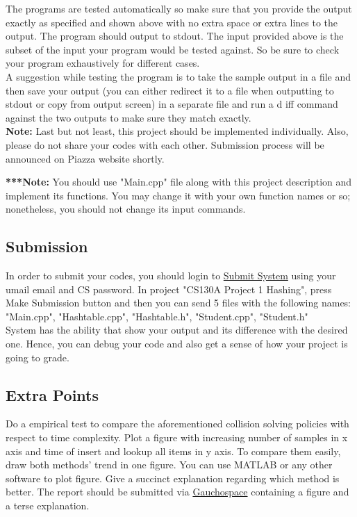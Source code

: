 \documentclass[times, 12pt]{article}
\begin{document}
The programs are tested automatically so make sure that you provide the output exactly as specified and shown above with no extra space or extra lines to the output. The program should output to stdout. The input provided above is the subset of the input your program would be
tested against. So be sure to check your program exhaustively for different cases.\\

A suggestion while testing the program is to take the sample output in a file and then save your output (you can either redirect it to a file when outputting to stdout or copy
from output screen) in a separate file and run a d	iff command against the two outputs to make sure they match exactly.\\

\textbf{Note:} Last but not least, this project should be implemented individually. Also, please do not share your codes with each other. Submission process will be announced on Piazza website shortly.

\textbf{***Note:} You should use "Main.cpp" file along with this project description and implement its functions. You may change it with your own function names or so; nonetheless, you should not change its input commands.


\subsection*{Submission}
In order to submit your codes, you should login to \href{https://submit.cs.ucsb.edu/}{Submit System} using your umail email and CS password. In project "CS130A Project 1 Hashing", press Make Submission button and then you can send 5 files with the following names:\\
"Main.cpp", "Hashtable.cpp", "Hashtable.h", "Student.cpp", "Student.h"\\
System has the ability that show your output and its difference with the desired one. Hence, you can debug your code and also get a sense of how your project is going to grade.

\subsection*{Extra Points}
Do a empirical test to compare the aforementioned collision solving policies with respect to time complexity. Plot a figure with increasing number of samples in x axis and time of insert and lookup all items in y axis. To compare them easily, draw both methods' trend in one figure. You can use MATLAB or any other software to plot figure. Give a succinct explanation regarding which method is better. The report should be submitted via \href{https://gauchospace.ucsb.edu/courses/mod/assign/view.php?id=515121}{Gauchospace} containing a figure and a terse explanation.
\end{document}
